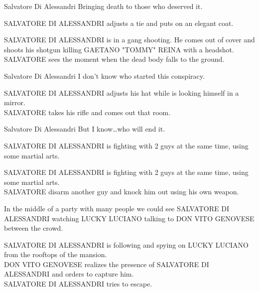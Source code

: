 \documentclass{screenplay}[2020/03/26]
\begin{document}
\begin{dialogue}[narrating]{Salvatore Di Alessandri}
Bringing death to those who deserved it.
\end{dialogue}


\fadein
{}
SALVATORE DI ALESSANDRI adjusts a tie and puts on an elegant coat.


\fadeout
{}
SALVATORE DI ALESSANDRI is in a gang shooting. He comes out of cover and shoots his shotgun killing GAETANO "TOMMY" REINA with a headshot. SALVATORE sees the moment when the dead body falls to the ground.

\begin{dialogue}[narrating]{Salvatore Di Alessandri}
I don't know who started this conspiracy.
\end{dialogue}


\fadein
{}
SALVATORE DI ALESSANDRI adjusts his hat while is looking himself in a mirror.
\\SALVATORE takes his rifle and comes out that room.

\begin{dialogue}[narrating]{Salvatore Di Alessandri}
But I know\dots who will end it.
\end{dialogue}


\fadeout
{}
SALVATORE DI ALESSANDRI is fighting with 2 guys at the same time, using some martial arts.


\fadein
{}
SALVATORE DI ALESSANDRI is fighting with 2 guys at the same time, using some martial arts.
\\SALVATORE disarm another guy and  knock him out using his own weapon.


\fadeout
{}
In the middle of a party with many people we could see SALVATORE DI ALESSANDRI watching LUCKY LUCIANO talking to DON VITO GENOVESE between the crowd.


\fadein
{}
SALVATORE DI ALESSANDRI is following and spying on LUCKY LUCIANO from the rooftops of the mansion.
\\DON VITO GENOVESE realizes the presence of SALVATORE DI ALESSANDRI and orders to capture him.
\\SALVATORE DI ALESSANDRI tries to escape.
\end{document}
